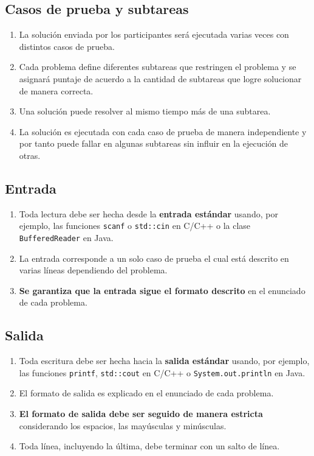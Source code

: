 \documentclass[12pt]{oci}
\begin{document}
\subsection*{Casos de prueba y subtareas}
\begin{enumerate}
\item La solución enviada por los participantes será ejecutada varias veces con
  distintos casos de prueba.
\item Cada problema define diferentes subtareas que restringen el problema y se
  asignará puntaje de acuerdo a la cantidad de subtareas que logre solucionar de
  manera correcta.
\item Una solución puede resolver al mismo tiempo más de una subtarea.
\item La solución es ejecutada con cada caso de prueba de manera independiente y
  por tanto puede fallar en algunas subtareas sin influir en la ejecución de
  otras.
\end{enumerate}

\subsection*{Entrada}
\begin{enumerate}
\item Toda lectura debe ser hecha desde la {\bf entrada estándar} usando, por
  ejemplo, las funciones \verb+scanf+ o \verb+std::cin+ en C/C++ o la clase
  \verb+BufferedReader+ en Java.
\item La entrada corresponde a un solo caso de prueba el cual está descrito en
  varias líneas dependiendo del problema.
\item {\bf Se garantiza que la entrada sigue el formato descrito} en el
  enunciado de cada problema.
\end{enumerate}

\newpage
\subsection*{Salida}
\begin{enumerate}
\item Toda escritura debe ser hecha hacia la {\bf salida estándar} usando, por
  ejemplo, las funciones \verb+printf+, \verb+std::cout+ en C/C++  o
  \verb+System.out.println+ en Java.
\item El formato de salida es explicado en el enunciado de cada problema.
\item {\bf El formato de salida debe ser seguido de manera estricta}
  considerando los espacios, las mayúsculas y minúsculas.
\item Toda línea, incluyendo la última, debe terminar con un salto de línea.
\end{enumerate}
\end{document}
